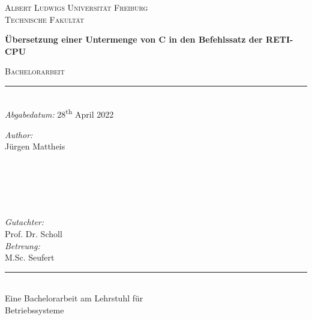 \begin{titlepage}
  \vspace{1cm}
  \center
  \textsc{\LARGE Albert Ludwigs Universität Freiburg}\\[0.5cm]
  \textsc{\Large Technische Fakultät}\\[2.0cm]


  \begin{tcolorbox}[title={\center \huge \bfseries PicoC-Compiler}, arc=0mm, boxrule=0mm]
    \center
    {\bfseries \center \LARGE {} Übersetzung einer Untermenge von C in den Befehlssatz der RETI-CPU\par}
  \end{tcolorbox}
    \textsc{\large Bachelorarbeit}\\
    \rule{\linewidth}{0.1mm}\\[0.5cm]

  {\large \emph{Abgabedatum:} 28\textsuperscript{th} April 2022}\\[2.5cm]

  \begin{minipage}{0.45\textwidth}
    \begin{flushleft} \large
      \emph{Author:}\\
      Jürgen Mattheis\\
      \hspace{1cm}\\
      \hspace{1cm}\\
      \hspace{1cm}\\
      \hspace{1cm}
    \end{flushleft}
  \end{minipage}
  ~
  \begin{minipage}{0.45\textwidth}
    \begin{flushright} \large
      \emph{Gutachter:}\\
      Prof. Dr. Scholl\\[0.64cm]
      \emph{Betreung:}\\
      M.Sc. Seufert\\
    \end{flushright}
  \end{minipage}

  \vspace{11.cm}
  \rule{11cm}{0.1mm}\\[0.25cm]
  \large{Eine Bachelorarbeit am Lehrstuhl für}\\
  \large{Betriebssysteme}
\end{titlepage}
